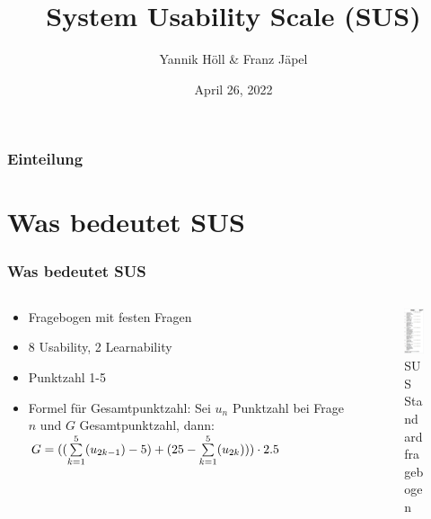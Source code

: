 \documentclass[12pt, aspectratio=169]{beamer}
\title{System Usability Scale (SUS)}
\author[Y. Höll, F. Jäpel]{Yannik Höll \& Franz Jäpel}
\date{April 26, 2022}
\begin{document}
\begin{frame}
	\titlepage
\end{frame}

\begin{frame}
	\frametitle{Einteilung}
	\tableofcontents
\end{frame}

\section{Was bedeutet SUS}
\begin{frame}
	\frametitle{Was bedeutet SUS}
	\begin{columns}
		\begin{column}{0.7\textwidth}
			\begin{itemize}
				\item<1> Fragebogen mit festen Fragen
				\item<1> 8 Usability, 2 Learnability
				\item<1> Punktzahl 1-5
				\item<1> Formel für Gesamtpunktzahl: 
				Sei $u_n$ Punktzahl bei Frage $n$ und $G$ Gesamtpunktzahl, dann:
				\begin{math} G=((\sum\limits_{k=1}^5(u_{2k-1})-5) + (25-\sum\limits_{k=1}^5(u_{2k}))) \cdot 2.5 $\\$ \end{math}
			\end{itemize}
		\end{column}
		\begin{column}{0.3\textwidth}
			\begin{figure}
				\centering
				\includegraphics[keepaspectratio=true, width=65px]{./image/sus.png}
				\caption{SUS Standardfragebogen \tiny{\cite{wiki1}}}
			\end{figure}		
		\end{column}
	\end{columns}
\end{frame}
\end{document}
